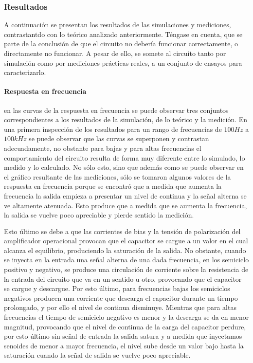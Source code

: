 \subsubsection{Resultados}
A continuaci\'on se presentan los resultados de las simulaciones y mediciones, contrastantdo con lo te\'orico analizado anteriormente. T\'engase en cuenta,
que se parte de la conclusi\'on de que el circuito no deber\'ia funcionar correctamente, o directamente no funcionar. A pesar de ello, se somete al circuito tanto por simulaci\'on
como por mediciones pr\'acticas reales, a un conjunto de ensayos para caracterizarlo.

\paragraph*{Respuesta en frecuencia} en las curvas de la respuesta en frecuencia se puede observar tres conjuntos correspondientes a los resultados de la 
simulaci\'on, de lo te\'orico y la medici\'on. En una primera inspecci\'on de los resultados para un rango de frecuencias de $100Hz$ a $100kHz$ se puede observar que
las curvas se superponen y contrastan adecuadamente, no obstante para bajas y para altas frecuencias el comportamiento del circuito resulta de forma muy diferente entre lo simulado,
lo medido y lo calculado. No s\'olo esto, sino que adem\'as como se puede observar en el gr\'afico resultante de las mediciones, s\'olo se tomaron algunos valores de la respuesta en frecuencia
porque se encontr\'o que a medida que aumenta la frecuencia la salida empieza a presentar un nivel de continua y la se\~nal alterna se ve altamente atenuada. Esto produce que a medida que se aumenta
la frecuencia, la salida se vuelve poco apreciable y pierde sentido la medici\'on.

Esto \'ultimo se debe a que las corrientes de bias y la tensi\'on de polarizaci\'on del amplificador operacional provocan que el capacitor se cargue a un valor en el cual alcanza el equilibrio,
produciendo la saturaci\'on de la salida. No obstante, cuando se inyecta en la entrada una se\~nal alterna de una dada frecuencia, en los semiciclo positivo y negativo, se produce una circulaci\'on de corriente
sobre la resistencia de la entrada del circuito que va en un sentido u otro, provocando que el capacitor se cargue y descargue. Por esto \'ultimo, para frecuencias bajas los semiciclos negativos producen una corriente que descarga el capacitor
durante un tiempo prolongado, y por ello el nivel de continua disminuye. Mientras que para altas frecuencias el tiempo de semiciclo negativo es menor y la descarga se da en menor magnitud, provocando que el nivel de continua
de la carga del capacitor perdure, por esto \'ultimo sin se\~nal de entrada la salida satura y a medida que inyectamos senoides de menor a mayor frecuencia, el nivel sube desde un valor bajo hasta la saturaci\'on cuando la se\~nal de salida
se vuelve poco apreciable.

